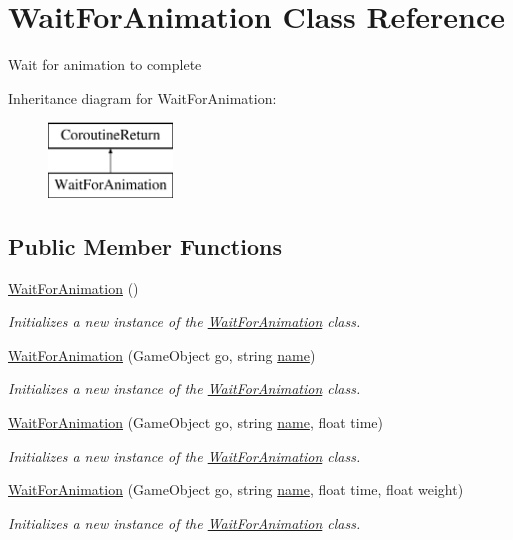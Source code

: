 \hypertarget{class_wait_for_animation}{}\section{Wait\+For\+Animation Class Reference}
\label{class_wait_for_animation}


Wait for animation to complete  


Inheritance diagram for Wait\+For\+Animation\+:\begin{figure}[H]
\begin{center}
\leavevmode
\includegraphics[height=2.000000cm]{class_wait_for_animation}
\end{center}
\end{figure}
\subsection*{Public Member Functions}
\begin{DoxyCompactItemize}
\item 
\hyperlink{class_wait_for_animation_a448f51289c6580ed559bdd5955c38498}{Wait\+For\+Animation} ()
\begin{DoxyCompactList}\small\item\em Initializes a new instance of the \hyperlink{class_wait_for_animation}{Wait\+For\+Animation} class. \end{DoxyCompactList}\item 
\hyperlink{class_wait_for_animation_a8a85909f01899724a26cd5451051039e}{Wait\+For\+Animation} (Game\+Object go, string \hyperlink{class_wait_for_animation_a2bd9db632988be8570fb739741d80222}{name})
\begin{DoxyCompactList}\small\item\em Initializes a new instance of the \hyperlink{class_wait_for_animation}{Wait\+For\+Animation} class. \end{DoxyCompactList}\item 
\hyperlink{class_wait_for_animation_a29e836a6688ce19b2a540619afeffca6}{Wait\+For\+Animation} (Game\+Object go, string \hyperlink{class_wait_for_animation_a2bd9db632988be8570fb739741d80222}{name}, float time)
\begin{DoxyCompactList}\small\item\em Initializes a new instance of the \hyperlink{class_wait_for_animation}{Wait\+For\+Animation} class. \end{DoxyCompactList}\item 
\hyperlink{class_wait_for_animation_a04692036277b56d5a182e65a399facd9}{Wait\+For\+Animation} (Game\+Object go, string \hyperlink{class_wait_for_animation_a2bd9db632988be8570fb739741d80222}{name}, float time, float weight)
\begin{DoxyCompactList}\small\item\em Initializes a new instance of the \hyperlink{class_wait_for_animation}{Wait\+For\+Animation} class. \end{DoxyCompactList}\end{DoxyCompactItemize}
